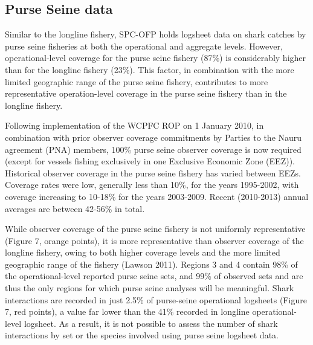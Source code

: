 \documentclass[12pt]{SCreport}
\begin{document}

\clearpage
 
 
 \subsection{Purse Seine data} 
Similar to the longline fishery, SPC-OFP holds logsheet data on shark catches by purse seine fisheries at both the operational and aggregate levels.  However, operational-level coverage for the purse seine fishery (87\%) is considerably higher than for the longline fishery (23\%). This factor, in combination with the more limited geographic range of the purse seine fishery, contributes to more representative operation-level coverage in the purse seine fishery than in the longline fishery.

Following implementation of the WCPFC ROP on 1 January 2010, in combination with prior observer coverage commitments by Parties to the Nauru agreement (PNA) members, 100\% purse seine observer coverage is now required (except for vessels fishing exclusively in one Exclusive Economic Zone (EEZ)). Historical observer coverage in the purse seine fishery has varied between EEZs. Coverage rates were low, generally less than 10\%, for the years 1995-2002, with coverage increasing to 10-18\% for the years 2003-2009. Recent (2010-2013) annual averages are between 42-56\% in total.


While observer coverage of the purse seine fishery is not uniformly representative (Figure 7, orange points), it is more representative than observer coverage of the longline fishery, owing to both higher coverage levels and the more limited geographic range of the fishery (Lawson 2011). Regions 3 and 4 contain 98\% of the operational-level reported purse seine sets, and 99\% of observed sets and are thus the only regions for which purse seine analyses will be meaningful. Shark interactions are recorded in just 2.5\% of purse-seine operational logsheets (Figure 7, red points), a value far lower than the 41\% recorded in longline operational-level logsheet. As a result, it is not possible to assess the number of shark interactions by set or the species involved using purse seine logsheet data.
\end{document}
